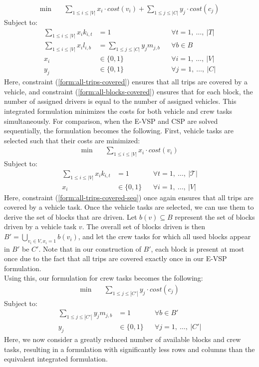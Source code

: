 \documentclass[]{article}
\begin{document}
\begin{align}
\min \quad
& \sum_{1 \leq i \leq |V|} x_{i} \cdot cost(v_i) + \sum_{1 \leq j \leq |C|} y_{j} \cdot cost(c_j)  
\end{align}
Subject to:
\begin{align}
\sum_{1 \leq i \leq |V|} x_{i}k_{i,t} &= 1 && \forall t = 1,\:\dots,\:|T| \label{form:all-trips-covered} \\
\sum_{1 \leq i \leq |V|}x_i l_{i,b}  &= \sum_{1 \leq j \leq |C|}y_j m_{j,b}  && \forall b \in B \label{form:all-blocks-covered} \\
x_{i} &\in \{ 0, 1 \} && \forall i = 1,\:\dots,\:|V| \\
y_{j} &\in \{ 0, 1 \} && \forall j = 1,\:\dots,\:|C|
\end{align}
Here, constraint (\ref{form:all-trips-covered}) ensures that all trips are covered by a vehicle, and constraint (\ref{form:all-blocks-covered}) ensures that for each block, the number of assigned drivers is equal to the number of assigned vehicles. This integrated formulation minimizes the costs for both vehicle and crew tasks simultaneously. For comparison, when the E-VSP and CSP are solved sequentially, the formulation becomes the following. First, vehicle tasks are selected such that their costs are minimized:
\begin{align}
\min \quad
& \sum_{1 \leq i \leq |V|} x_{i} \cdot cost(v_i)
\end{align}
Subject to:
\begin{align}
\sum_{1 \leq i \leq |V|} x_{i}k_{i,t} &= 1 && \forall t = 1,\:\dots,\:|\mathcal{T}| \label{form:all-trips-covered-seq} \\
x_{i} &\in \{ 0, 1 \} && \forall i = 1,\:\dots,\:|V|
\end{align}
Here, constraint (\ref{form:all-trips-covered-seq}) once again ensures that all trips are covered by a vehicle task. Once the vehicle tasks are selected, we can use them to derive the set of blocks that are driven. Let $b(v) \subseteq B$ represent the set of blocks driven by a vehicle task $v$. The overall set of blocks driven is then $B' = \bigcup_{v_i \in V, x_i = 1}b(v_i)$, and let the crew tasks for which all used blocks appear in $B'$ be $C'$. Note that in our construction of $B'$, each block is present at most once due to the fact that all trips are covered exactly once in our E-VSP formulation. \\
Using this, our formulation for crew tasks becomes the following:
\begin{align}
\min \quad
& \sum_{1 \leq j \leq |C'|} y_{j} \cdot cost(c_j)  
\end{align}
Subject to:
\begin{align}
\sum_{1 \leq j \leq |C'|} y_j m_{j,b} &= 1  && \forall b \in B' \label{form:all-blocks-covered-seq} \\
y_{j} &\in \{ 0, 1 \} && \forall j = 1,\:\dots,\:|C'|
\end{align}
Here, we now consider a greatly reduced number of available blocks and crew tasks, resulting in a formulation with significantly less rows and columns than the equivalent integrated formulation.
\end{document}
